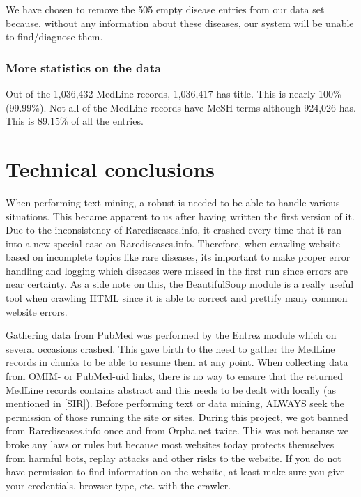 We have chosen to remove the 505 empty disease entries from our
data set because, without any information about these diseases, our
system will be unable to find/diagnose them.

\subsubsection{More statistics on the data}
Out of the 1,036,432 MedLine records, 1,036,417 has title. This is
nearly 100\% (99.99\%). Not all of the MedLine records have MeSH terms
although 924,026 has. This is 89.15\% of all the entries. 

\section{Technical conclusions}

When performing text mining, a robust is needed to be able to handle
various situations. This became apparent to us after having written
the first version of it. Due to the inconsistency of
Rarediseases.info, it crashed every time that it ran into a new
special case on Rarediseases.info. Therefore, when crawling website
based on incomplete topics like rare diseases, its important to make
proper error handling and logging which diseases were missed in the
first run since errors are near certainty. As a side note on this, the
BeautifulSoup module is a really useful tool when crawling HTML since
it is able to correct and prettify many common website errors.

Gathering data from PubMed was performed by the Entrez module which on
several occasions crashed. This gave birth to the need to gather the
MedLine records in chunks to be able to resume them at any point. When
collecting data from OMIM- or PubMed-uid links, there is no way to
ensure that the returned MedLine records contains abstract and this
needs to be dealt with locally (as mentioned in \ref{SIR}). Before
performing text or data mining, ALWAYS seek the permission of those
running the site or sites. During this project, we got banned from
Rarediseases.info once and from Orpha.net twice. This was not because
we broke any laws or rules but because most websites today protects
themselves from harmful bots, replay attacks and other risks to the
website. If you do not have permission to find information on the
website, at least make sure you give your credentials, browser type,
etc. with the crawler.

